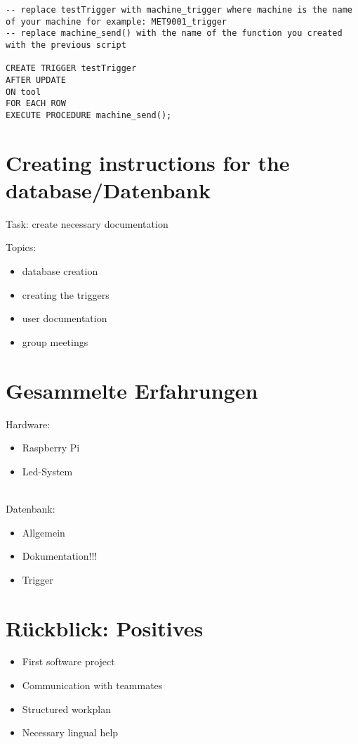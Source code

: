 \documentclass[ignorenonframetext, 11pt, table]{beamer}
\begin{document}
\begin{frame}[fragile]
\begin{lstlisting}[label=trigger2, basicstyle =\tiny]
-- replace testTrigger with machine_trigger where machine is the name of your machine for example: MET9001_trigger
-- replace machine_send() with the name of the function you created with the previous script

CREATE TRIGGER testTrigger
AFTER UPDATE
ON tool
FOR EACH ROW
EXECUTE PROCEDURE machine_send();
\end{lstlisting}
\end{frame}

\section*{Creating instructions for the database/Datenbank}
\begin{frame}
Task: create necessary documentation\newline\pause

Topics:\pause
\begin{itemize}
\item database creation\pause
\item creating the triggers\pause
\item user documentation\pause
\item group meetings
\end{itemize}
\end{frame}

\section*{Gesammelte Erfahrungen}
\begin{frame}
Hardware:\pause
\begin{itemize}
\item Raspberry Pi\pause
\item Led-System\pause
\end{itemize}
~\\
Datenbank:
\begin{itemize}
\item Allgemein\pause
\item Dokumentation!!!\pause
\item Trigger
\end{itemize}
\end{frame}

\section*{Rückblick: Positives}
\begin{frame}
\begin{itemize}
\item First software project\pause
\item Communication with teammates\pause 
\item Structured workplan\pause
\item Necessary lingual help
\end{itemize}
\end{frame}
\end{document}
